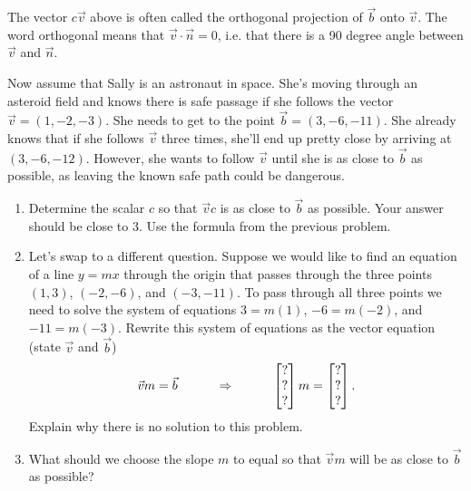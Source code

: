 The vector $c\vec v$ above is often called the orthogonal projection of $\vec b$ onto $\vec v$. The word orthogonal means that $\vec v\cdot \vec n=0$, i.e. that there is a 90 degree angle between $\vec v$ and $\vec n$. 


\begin{problem}
 Now assume that Sally is an astronaut in space. She's moving through an asteroid field and knows there is safe passage if she follows the vector $\vec v = (1,-2,-3)$. She needs to get to the point $\vec b=(3,-6,-11)$. She already knows that if she follows $\vec v$ three times, she'll end up pretty close by arriving at $(3,-6,-12)$. However, she wants to follow $\vec v$ until she is as close to $\vec b$ as possible, as leaving the known safe path could be dangerous.  
\begin{enumerate}
 \item 
Determine the scalar $c$ so that $\vec v c$ is as close to $\vec b$ as possible. Your answer should be close to 3.  Use the formula from the previous problem.
  \item 
Let's swap to a different question. 
Suppose we would like to find an equation of a line $y=mx$ through the origin that passes through the three points  $(1,3)$, $(-2,-6)$, and $(-3,-11)$.
To pass through all three points we need to solve the system of equations $3=m(1)$, $-6=m(-2)$, and $-11=m(-3)$. 
Rewrite this system of equations as the vector equation (state $\vec v$ and $\vec b$) 
$$\vec v m = \vec b \quad\quad\quad\Rightarrow\quad\quad\quad \begin{bmatrix} ?\\?\\? \end{bmatrix}m = \begin{bmatrix} ?\\?\\? \end{bmatrix}.$$
Explain why there is no solution to this problem. 
  \item
What should we choose the slope $m$ to equal so that $\vec v m$ will be as close to $\vec b$ as possible? 
 \end{enumerate}
\end{problem}


\mysubsection{\ideacon}

